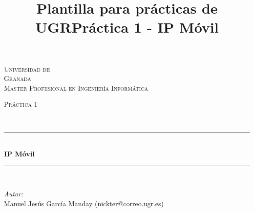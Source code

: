 \documentclass[10pt]{article}
\title{Plantilla para prácticas de UGR}
\title{Práctica 1 - IP Móvil}
\begin{document}
\begin{center}																		%
\newcommand{\HRule}{\rule{\linewidth}{0.5mm}}									%
\begin{minipage}{0.48\textwidth} \begin{flushleft}
\end{flushleft}\end{minipage}
\begin{minipage}{0.48\textwidth} \begin{flushright}
\end{flushright}\end{minipage}

\vspace*{-1.5cm}								%
\textsc{\huge Universidad de\\ \vspace{5px} Granada}\\[1.5cm]	

\textsc{\LARGE Master Profesional en Ingenier\'ia Inform\'atica }\\[1.5cm]													%

\begin{minipage}{0.9\textwidth} 
\begin{center}																					%
\textsc{\LARGE Pr\'actica 1}
\end{center}
\end{minipage}\\[0.5cm]
 			\vspace*{1cm}																		%
\HRule \\[0.4cm]																	%
{ \huge \bfseries IP Móvil}\\[0.4cm]	%
\HRule \\[1.5cm]																	%
\begin{minipage}{0.46\textwidth}													%
\begin{flushleft} \large															%
\emph{Autor:}\\	
Manuel Jes\'us Garc\'ia Manday (nickter@correo.ugr.es)\\
\end{flushleft}																		%
\end{minipage}		
\begin{minipage}{0.52\textwidth}		
\vspace{-0.6cm}											%
\begin{flushright} \large															%
\end{flushright}																	%
\end{minipage}	
\vspace*{1cm}
 	

\end{center}
\end{document}
